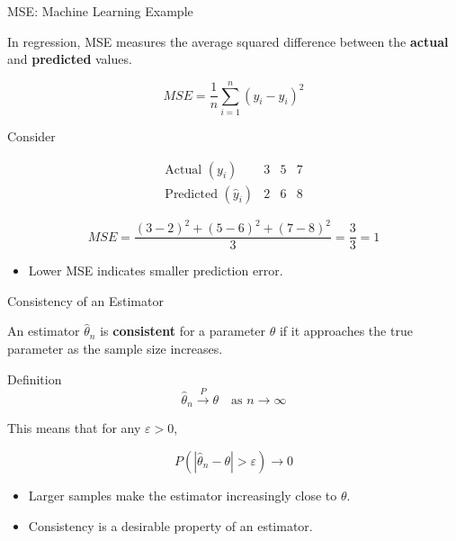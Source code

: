 \documentclass{beamer}
\begin{document}

\begin{frame}{MSE: Machine Learning Example}

In regression, MSE measures the average squared difference
between the \textbf{actual} and \textbf{predicted} values.

\[
\boxed{
MSE=
\frac{1}{n}
\sum_{i=1}^{n}
(y_i-\hat y_i)^2
}
\]

Consider

\[
\begin{array}{c|ccc}
\text{Actual }(y_i) & 3 & 5 & 7\\
\hline
\text{Predicted }(\hat y_i) & 2 & 6 & 8
\end{array}
\]

\[
MSE
=
\frac{(3-2)^2+(5-6)^2+(7-8)^2}{3}
=
\frac{3}{3}
=
\boxed{1}
\]

\begin{itemize}
    \item Lower MSE indicates smaller prediction error.
\end{itemize}

\end{frame}


\begin{frame}{Consistency of an Estimator}

An estimator $\hat{\theta}_n$ is \textbf{consistent} for a parameter
$\theta$ if it approaches the true parameter as the sample size
increases.

\begin{block}{Definition}
\[
\boxed{
\hat{\theta}_n
\xrightarrow{P}
\theta
\quad\text{as } n\rightarrow\infty
}
\]
\end{block}

This means that for any $\varepsilon>0$,

\[
P\left(
|\hat{\theta}_n-\theta|>\varepsilon
\right)
\longrightarrow 0
\]

\begin{itemize}
    \item Larger samples make the estimator increasingly close to $\theta$.
    \item Consistency is a desirable property of an estimator.
\end{itemize}

\end{frame}
\end{document}

